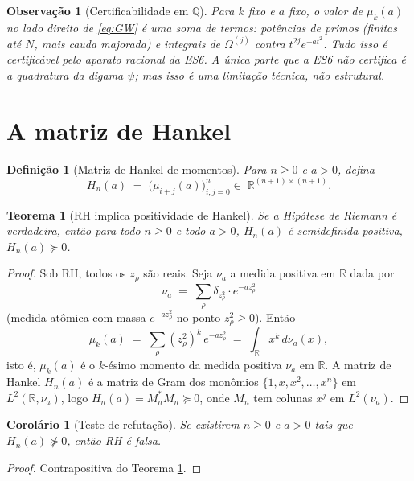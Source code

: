 \documentclass[12pt,a4paper]{article}
\newtheorem{teorema}{Teorema}
\newtheorem{corolario}{Corolário}
\newtheorem{observacao}{Observação}
\newtheorem{definicao}{Definição}
\begin{document}
\begin{observacao}[Certificabilidade em $\mathbb{Q}$]
Para $k$ fixo e $a$ fixo, o valor de $\mu_k(a)$ no lado direito de
\eqref{eq:GW} é uma soma de termos: potências de primos (finitas até
$N$, mais cauda majorada) e integrais de $\Omega^{(j)}$ contra $t^{2j}
e^{-at^2}$. Tudo isso é certificável pelo aparato racional da ES6. A
única parte que a ES6 não certifica é a quadratura da digama
$\psi$; mas isso é uma limitação \emph{técnica}, não \emph{estrutural}.
\end{observacao}

\section{A matriz de Hankel}

\begin{definicao}[Matriz de Hankel de momentos]\label{def:hankel}
Para $n\ge 0$ e $a>0$, defina
\[
  H_n(a) \;=\; \bigl(\mu_{i+j}(a)\bigr)_{i,j=0}^{n}
  \in\; \mathbb{R}^{(n+1)\times(n+1)}.
\]
\end{definicao}

\begin{teorema}[RH implica positividade de Hankel]\label{thm:RH-PSD}
Se a Hipótese de Riemann é verdadeira, então para todo $n\ge 0$ e todo
$a>0$, $H_n(a)$ é semidefinida positiva, $H_n(a)\succeq 0$.
\end{teorema}

\begin{proof}
Sob RH, todos os $z_\rho$ são reais. Seja $\nu_a$ a medida positiva em
$\mathbb{R}$ dada por
\[
  \nu_a \;=\; \sum_{\rho}\delta_{z_\rho^2}\cdot e^{-az_\rho^2}
\]
(medida atômica com massa $e^{-az_\rho^2}$ no ponto $z_\rho^2\ge 0$).
Então
\[
  \mu_k(a) \;=\; \sum_\rho (z_\rho^2)^k\,e^{-az_\rho^2}
  \;=\; \int_{\mathbb{R}} x^k\,d\nu_a(x),
\]
isto é, $\mu_k(a)$ é o $k$-ésimo momento da medida positiva $\nu_a$
em $\mathbb{R}$. A matriz de Hankel $H_n(a)$ é a matriz de Gram dos
monômios $\{1,x,x^2,\dots,x^n\}$ em $L^2(\mathbb{R},\nu_a)$, logo
$H_n(a) = M_n^*M_n \succeq 0$, onde $M_n$ tem colunas $x^j$ em
$L^2(\nu_a)$.
\end{proof}

\begin{corolario}[Teste de refutação]\label{cor:refute}
Se existirem $n\ge 0$ e $a>0$ tais que $H_n(a)\not\succeq 0$, então RH
é falsa.
\end{corolario}

\begin{proof}
Contrapositiva do Teorema \ref{thm:RH-PSD}.
\end{proof}
\end{document}
